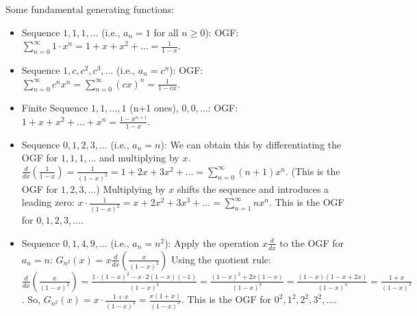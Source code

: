 \documentclass{report}
\begin{document}
Some fundamental generating functions:
\begin{itemize}
    \item Sequence $1, 1, 1, \dots$ (i.e., $a_n = 1$ for all $n \ge 0$):
    OGF: $\sum_{n=0}^\infty 1 \cdot x^n = 1 + x + x^2 + \dots = \frac{1}{1-x}$.
    \item Sequence $1, c, c^2, c^3, \dots$ (i.e., $a_n = c^n$):
    OGF: $\sum_{n=0}^\infty c^n x^n = \sum_{n=0}^\infty (cx)^n = \frac{1}{1-cx}$.
    \item Finite Sequence $1, 1, \dots, 1$ (n+1 ones), $0, 0, \dots$:
    OGF: $1 + x + x^2 + \dots + x^n = \frac{1-x^{n+1}}{1-x}$.
    \item Sequence $0, 1, 2, 3, \dots$ (i.e., $a_n = n$):
    We can obtain this by differentiating the OGF for $1, 1, 1, \dots$ and multiplying by $x$.
    $\frac{d}{dx} \left( \frac{1}{1-x} \right) = \frac{1}{(1-x)^2} = 1 + 2x + 3x^2 + \dots = \sum_{n=0}^\infty (n+1)x^n$. (This is the OGF for $1, 2, 3, \dots$)
    Multiplying by $x$ shifts the sequence and introduces a leading zero:
    $x \cdot \frac{1}{(1-x)^2} = x + 2x^2 + 3x^3 + \dots = \sum_{n=1}^\infty n x^n$. This is the OGF for $0, 1, 2, 3, \dots$.
    \item Sequence $0, 1, 4, 9, \dots$ (i.e., $a_n = n^2$):
    Apply the operation $x \frac{d}{dx}$ to the OGF for $a_n=n$:
    $G_{n^2}(x) = x \frac{d}{dx} \left( \frac{x}{(1-x)^2} \right)$
    Using the quotient rule: $\frac{d}{dx} \left( \frac{x}{(1-x)^2} \right) = \frac{1 \cdot (1-x)^2 - x \cdot 2(1-x)(-1)}{(1-x)^4} = \frac{(1-x)^2 + 2x(1-x)}{(1-x)^4} = \frac{(1-x)(1-x+2x)}{(1-x)^4} = \frac{1+x}{(1-x)^3}$.
    So, $G_{n^2}(x) = x \cdot \frac{1+x}{(1-x)^3} = \frac{x(1+x)}{(1-x)^3}$.
    This is the OGF for $0^2, 1^2, 2^2, 3^2, \dots$.
\end{itemize}

\end{document}
